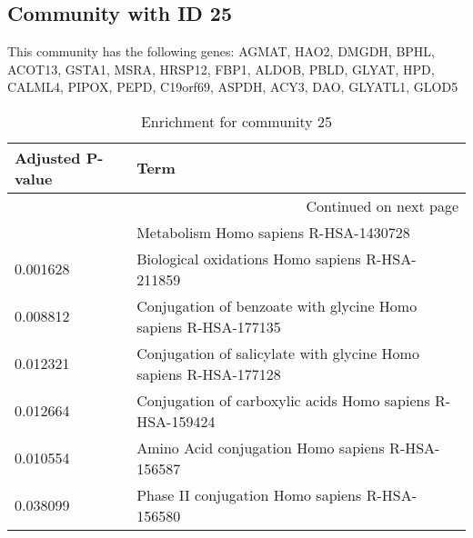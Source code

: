 \subsection*{Community with ID 25}
This community has the following genes: AGMAT, HAO2, DMGDH, BPHL, ACOT13, GSTA1, MSRA, HRSP12, FBP1, ALDOB, PBLD, GLYAT, HPD, CALML4, PIPOX, PEPD, C19orf69, ASPDH, ACY3, DAO, GLYATL1, GLOD5
\\
\begin{longtable}{p{2.4cm}p{14.5cm}}
\caption{Enrichment for community 25}\\
\toprule
Adjusted \newline P-value &                                                              Term \\
\midrule
\endhead
\midrule
\multicolumn{2}{r}{{Continued on next page}} \\
\midrule
\endfoot

\bottomrule
\endlastfoot
                 0.000001 &                             Metabolism Homo sapiens R-HSA-1430728 \\
                 0.001628 &                   Biological oxidations Homo sapiens R-HSA-211859 \\
                 0.008812 &    Conjugation of benzoate with glycine Homo sapiens R-HSA-177135 \\
                 0.012321 &  Conjugation of salicylate with glycine Homo sapiens R-HSA-177128 \\
                 0.012664 &         Conjugation of carboxylic acids Homo sapiens R-HSA-159424 \\
                 0.010554 &                  Amino Acid conjugation Homo sapiens R-HSA-156587 \\
                 0.038099 &                    Phase II conjugation Homo sapiens R-HSA-156580 \\
\end{longtable}



